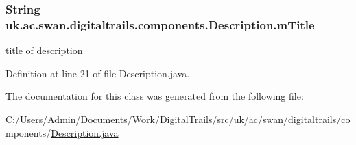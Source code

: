 \hypertarget{classuk_1_1ac_1_1swan_1_1digitaltrails_1_1components_1_1_description_a316508bffd08105017ab21f7ce87801d}{
\subsubsection[{m\+Title}]{\setlength{\rightskip}{0pt plus 5cm}String uk.\+ac.\+swan.\+digitaltrails.\+components.\+Description.\+m\+Title\hspace{0.3cm}{\ttfamily [protected]}}}\label{classuk_1_1ac_1_1swan_1_1digitaltrails_1_1components_1_1_description_a316508bffd08105017ab21f7ce87801d}


title of description 



Definition at line 21 of file Description.\+java.



The documentation for this class was generated from the following file\+:\begin{DoxyCompactItemize}
\item 
C\+:/\+Users/\+Admin/\+Documents/\+Work/\+Digital\+Trails/src/uk/ac/swan/digitaltrails/components/\hyperlink{_description_8java}{Description.\+java}\end{DoxyCompactItemize}

